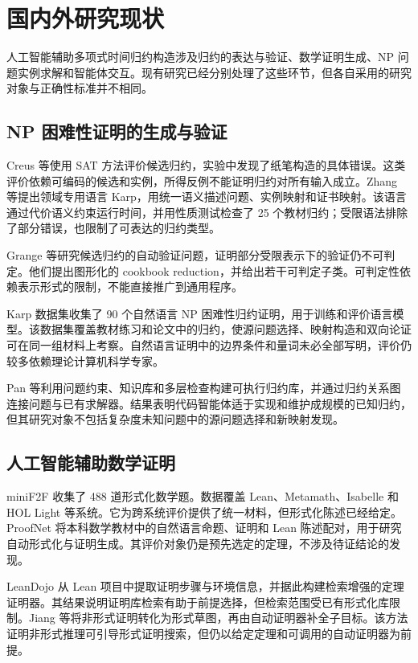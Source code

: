 \chapter{国内外研究现状}\label{chap:related}

人工智能辅助多项式时间归约构造涉及归约的表达与验证、数学证明生成、NP 问题实例求解和智能体交互。现有研究已经分别处理了这些环节，但各自采用的研究对象与正确性标准并不相同。

\section{NP 困难性证明的生成与验证}

Creus 等使用 SAT 方法评价候选归约，实验中发现了纸笔构造的具体错误\citep{creus2014automatic}。这类评价依赖可编码的候选和实例，所得反例不能证明归约对所有输入成立。Zhang 等提出领域专用语言 Karp，用统一语义描述问题、实例映射和证书映射\citep{zhang2022karp}。该语言通过代价语义约束运行时间，并用性质测试检查了 25 个教材归约；受限语法排除了部分错误，也限制了可表达的归约类型。

Grange 等研究候选归约的自动验证问题，证明部分受限表示下的验证仍不可判定\citep{grange2024verification}。他们提出图形化的 cookbook reduction，并给出若干可判定子类。可判定性依赖表示形式的限制，不能直接推广到通用程序。

Karp 数据集收集了 90 个自然语言 NP 困难性归约证明，用于训练和评价语言模型\citep{dicicco2025karpdataset}。该数据集覆盖教材练习和论文中的归约，使源问题选择、映射构造和双向论证可在同一组材料上考察。自然语言证明中的边界条件和量词未必全部写明，评价仍较多依赖理论计算机科学专家。

Pan 等利用问题约束、知识库和多层检查构建可执行归约库，并通过归约关系图连接问题与已有求解器\citep{pan2026reductions}。结果表明代码智能体适于实现和维护成规模的已知归约，但其研究对象不包括复杂度未知问题中的源问题选择和新映射发现。

\section{人工智能辅助数学证明}

miniF2F 收集了 488 道形式化数学题\citep{zheng2022minif2f}。数据覆盖 Lean、Metamath、Isabelle 和 HOL Light 等系统。它为跨系统评价提供了统一材料，但形式化陈述已经给定。ProofNet 将本科数学教材中的自然语言命题、证明和 Lean 陈述配对，用于研究自动形式化与证明生成\citep{azerbayev2023proofnet}。其评价对象仍是预先选定的定理，不涉及待证结论的发现。


LeanDojo 从 Lean 项目中提取证明步骤与环境信息，并据此构建检索增强的定理证明器\citep{yang2023leandojo}。其结果说明证明库检索有助于前提选择，但检索范围受已有形式化库限制。Jiang 等将非形式证明转化为形式草图，再由自动证明器补全子目标\citep{jiang2023draft}。该方法证明非形式推理可引导形式证明搜索，但仍以给定定理和可调用的自动证明器为前提。

